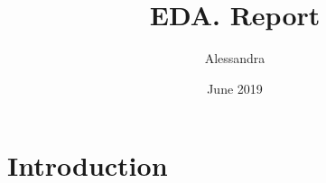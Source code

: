 \documentclass{article}
\title{EDA. Report}
\author{Alessandra }
\date{June 2019}
\begin{document}
\maketitle

\section{Introduction}
\end{document}
